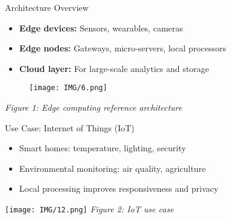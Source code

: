 \documentclass{beamer}
\begin{document}
\begin{frame}{Architecture Overview}
  \begin{itemize}
    \item \textbf{Edge devices:} Sensors, wearables, cameras
    \item \textbf{Edge nodes:} Gateways, micro-servers, local processors
    \item \textbf{Cloud layer:} For large-scale analytics and storage
  \end{itemize}
  \vspace{0.5cm}
  \centering
  \begin{figure}
    \centering
    \texttt{[image: IMG/6.png]} %
  \end{figure}

  \vspace{0.2cm}
  \small \textit{Figure 1: Edge computing reference architecture}

\end{frame}

\begin{frame}{Use Case: Internet of Things (IoT)}
  \begin{itemize}
    \item Smart homes: temperature, lighting, security
    \item Environmental monitoring: air quality, agriculture
    \item Local processing improves responsiveness and privacy
  \end{itemize}
  \vspace{0.5cm}
  \centering
  \texttt{[image: IMG/12.png]} %
  \vspace{0.2cm}
  \small \textit{Figure 2: IoT use case}
\end{frame}
\end{document}
